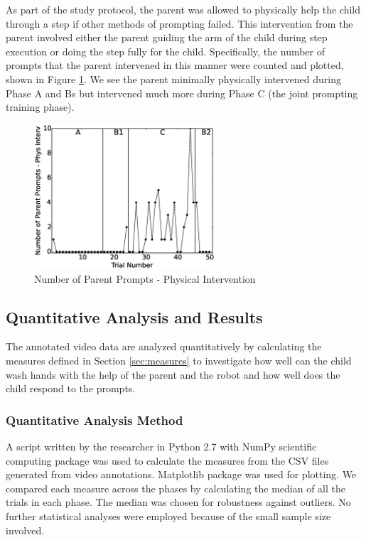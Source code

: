As part of the study protocol, the parent was allowed to physically help the child through a step if other methods of prompting failed.  This intervention from the parent involved either the parent guiding the arm of the child during step execution or doing the step fully for the child.  Specifically, the number of prompts that the parent intervened in this manner were counted and plotted, shown in Figure \ref{fig:7NumberofParentPrompts-PhysInterv}.  We see the parent minimally physically intervened during Phase A and Bs but intervened much more during Phase C (the joint prompting training phase).
\begin{figure} [h]
	\centering
	\includegraphics[width=0.6\textwidth]{./img/data_analysis/7NumberofParentPrompts-PhysInterv.eps}
	\caption{Number of Parent Prompts - Physical Intervention}
	\label{fig:7NumberofParentPrompts-PhysInterv}
\end{figure}


\subsection{Quantitative Analysis and Results}
\label{sec:QuantitativeData_results}
The annotated video data are analyzed quantitatively by calculating the measures defined in Section \ref{sec:measures} to investigate how well can the child wash hands with the help of the parent and the robot and how well does the child respond to the prompts.

\subsubsection{Quantitative Analysis Method}
A script written by the researcher in Python 2.7 with NumPy scientific computing package was used to calculate the measures from the CSV files generated from video annotations.  Matplotlib package was used for plotting.  We compared each measure across the phases by calculating the median of all the trials in each phase.  The median was chosen for robustness against outliers.  No further statistical analyses were employed because of the small sample size involved.

